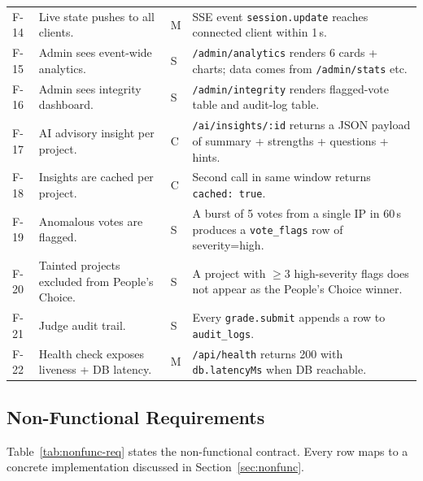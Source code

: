 \begin{longtable}{p{}p{}p{}p{}}
  F-14 & Live state pushes to all clients. & M & SSE event \texttt{session.update} reaches connected client within 1\,s. \\
  F-15 & Admin sees event-wide analytics. & S & \texttt{/admin/analytics} renders 6 cards + charts; data comes from \texttt{/admin/stats} etc. \\
  F-16 & Admin sees integrity dashboard. & S & \texttt{/admin/integrity} renders flagged-vote table and audit-log table. \\
  F-17 & AI advisory insight per project. & C & \texttt{/ai/insights/:id} returns a JSON payload of summary + strengths + questions + hints. \\
  F-18 & Insights are cached per project. & C & Second call in same window returns \texttt{cached: true}. \\
  F-19 & Anomalous votes are flagged. & S & A burst of 5 votes from a single IP in 60\,s produces a \texttt{vote\_flags} row of severity=high. \\
  F-20 & Tainted projects excluded from People's Choice. & S & A project with $\geq 3$ high-severity flags does not appear as the People's Choice winner. \\
  F-21 & Judge audit trail. & S & Every \texttt{grade.submit} appends a row to \texttt{audit\_logs}. \\
  F-22 & Health check exposes liveness + DB latency. & M & \texttt{/api/health} returns 200 with \texttt{db.latencyMs} when DB reachable. \\

  \bottomrule
\end{longtable}

\subsection{Non-Functional Requirements}

Table~\ref{tab:nonfunc-req} states the non-functional contract. Every row
maps to a concrete implementation discussed in
Section~\ref{sec:nonfunc}.

